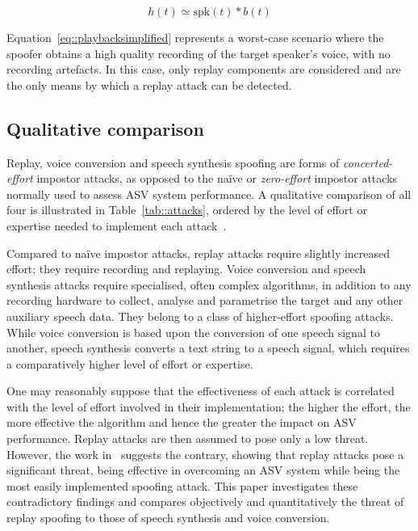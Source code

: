 \begin{equation}
h(t) \simeq \mathrm{spk}(t) * b(t)
\label{eq::playbacksimplified}
\end{equation}

Equation~\ref{eq::playbacksimplified} represents a worst-case scenario where the spoofer obtains a high quality recording of the target speaker's voice, with no recording artefacts.  In this case, only replay components are considered and are the only means by which a replay attack can be detected.



\subsection{Qualitative comparison}
\label{sec::algorithms::comparison}



Replay, voice conversion and speech synthesis spoofing are forms of \emph{concerted-effort} impostor attacks, as opposed to the na\"{i}ve or \emph{zero-effort} impostor attacks normally used to assess ASV system performance.  A qualitative comparison of all four is illustrated in Table~\ref{tab::attacks}, ordered by the level of effort or expertise needed to implement each attack~\cite{Wu2014a}. 

Compared to na\"{i}ve impostor attacks, replay attacks require slightly increased effort; they require recording and replaying. Voice conversion and speech synthesis attacks require specialised, often complex algorithms, in addition to any recording hardware to collect, analyse and parametrise the target and any other auxiliary speech data.  They belong to a class of higher-effort spoofing attacks.  While voice conversion is based upon the conversion of one speech signal to another, speech synthesis converts a text string to a speech signal, which requires a comparatively higher level of effort or expertise.

One may reasonably suppose that the effectiveness of each attack is correlated with the level of effort involved in their implementation; the higher the effort, the more effective the algorithm and hence the greater the impact on ASV performance.  Replay attacks are then assumed to pose only a low threat.  However, the work in~\cite{Alegre2014,Wu2014} suggests the contrary, showing that replay attacks pose a significant threat, being effective in overcoming an ASV system while being the most easily implemented spoofing attack.  This paper investigates these contradictory findings and compares objectively and quantitatively the threat of replay spoofing to those of speech synthesis and voice conversion.
